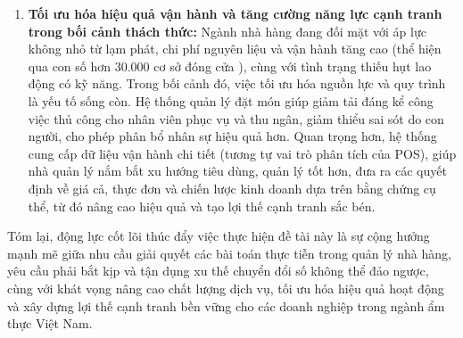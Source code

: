 \begin{enumerate}
    \item \textbf{Tối ưu hóa hiệu quả vận hành và tăng cường năng lực cạnh tranh trong bối cảnh thách thức:} Ngành nhà hàng đang đối mặt với áp lực không nhỏ từ lạm phát, chi phí nguyên liệu và vận hành tăng cao (thể hiện qua con số hơn 30.000 cơ sở đóng cửa \cite{USDA}), cùng với tình trạng thiếu hụt lao động có kỹ năng. Trong bối cảnh đó, việc tối ưu hóa nguồn lực và quy trình là yếu tố sống còn. Hệ thống quản lý đặt món giúp giảm tải đáng kể công việc thủ công cho nhân viên phục vụ và thu ngân, giảm thiểu sai sót do con người, cho phép phân bổ nhân sự hiệu quả hơn. Quan trọng hơn, hệ thống cung cấp dữ liệu vận hành chi tiết (tương tự vai trò phân tích của POS), giúp nhà quản lý nắm bắt xu hướng tiêu dùng, quản lý tốt hơn, đưa ra các quyết định về giá cả, thực đơn và chiến lược kinh doanh dựa trên bằng chứng cụ thể, từ đó nâng cao hiệu quả và tạo lợi thế cạnh tranh sắc bén.
\end{enumerate}

Tóm lại, động lực cốt lõi thúc đẩy việc thực hiện đề tài này là sự cộng hưởng mạnh mẽ giữa nhu cầu giải quyết các bài toán thực tiễn trong quản lý nhà hàng, yêu cầu phải bắt kịp và tận dụng xu thế chuyển đổi số không thể đảo ngược, cùng với khát vọng nâng cao chất lượng dịch vụ, tối ưu hóa hiệu quả hoạt động và xây dựng lợi thế cạnh tranh bền vững cho các doanh nghiệp trong ngành ẩm thực Việt Nam.